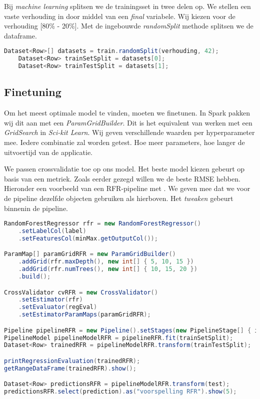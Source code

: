 \documentclass[a4paper,10pt,twoside]{report}
\begin{document}
Bij \textit{machine learning} splitsen we de trainingsset in twee delen op. We stellen een vaste verhouding in door middel van een \textit{final} variabele. Wij kiezen voor de verhouding [80\% - 20\%]. Met de ingebouwde \textit{randomSplit} methode splitsen we de dataframe. 

\begin{lstlisting}[language=Java]
	Dataset<Row>[] datasets = train.randomSplit(verhouding, 42);
	Dataset<Row> trainSetSplit = datasets[0];
	Dataset<Row> trainTestSplit = datasets[1];
\end{lstlisting}

\newpage

\subsection*{Finetuning}

Om het meest optimale model te vinden, moeten we finetunen. In Spark pakken wij dit aan met een \textit{ParamGridBuilder}. Dit is het equivalent van werken met een \textit{GridSearch} in \textit{Sci-kit Learn}. Wij geven verschillende waarden per hyperparameter mee. Iedere combinatie zal worden getest. Hoe meer parameters, hoe langer de uitvoertijd van de applicatie. 

We passen crossvalidatie toe op ons model. Het beste model kiezen gebeurt op basis van een metriek. Zoals eerder gezegd willen we de beste RMSE hebben. Hieronder een voorbeeld van een RFR-pipeline met . We geven mee dat we voor de pipeline dezelfde objecten gebruiken als hierboven. Het \textit{tweaken} gebeurt binnenin de pipeline.

\begin{lstlisting}[language=Java]
RandomForestRegressor rfr = new RandomForestRegressor()
	.setLabelCol(label)
	.setFeaturesCol(minMax.getOutputCol());

ParamMap[] paramGridRFR = new ParamGridBuilder()
	.addGrid(rfr.maxDepth(), new int[] { 5, 10, 15 })
	.addGrid(rfr.numTrees(), new int[] { 10, 15, 20 })
	.build();

CrossValidator cvRFR = new CrossValidator()
	.setEstimator(rfr)
	.setEvaluator(regEval)
	.setEstimatorParamMaps(paramGridRFR);

Pipeline pipelineRFR = new Pipeline().setStages(new PipelineStage[] { indexer, assembler, minMax, cvRFR });
PipelineModel pipelineModelRFR = pipelineRFR.fit(trainSetSplit);
Dataset<Row> trainedRFR = pipelineModelRFR.transform(trainTestSplit);

printRegressionEvaluation(trainedRFR);
getRangeDataFrame(trainedRFR).show();

Dataset<Row> predictionsRFR = pipelineModelRFR.transform(test);
predictionsRFR.select(prediction).as("voorspelling RFR").show(5);
\end{lstlisting}
\end{document}
